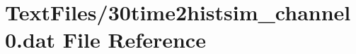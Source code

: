\hypertarget{30time2histsim__channel0_8dat}{}\section{Text\+Files/30time2histsim\+\_\+channel0.dat File Reference}
\label{30time2histsim__channel0_8dat}
